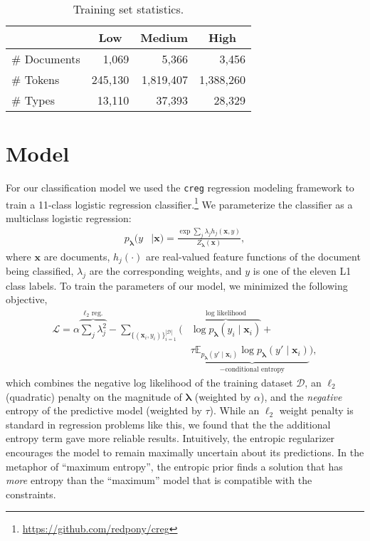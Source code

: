\documentclass[11pt,letterpaper]{article}
\begin{document}
\begin{table}[hbt]
\small\centering
\begin{tabular}{lrrr}
  & \multicolumn{1}{c}{\textbf{Low}} & \multicolumn{1}{c}{\textbf{Medium}} & \multicolumn{1}{c}{\textbf{High}} \\
\hline
\# Documents & 1,069 & 5,366 & 3,456 \\
\# Tokens & 245,130 & 1,819,407 & 1,388,260 \\ 
\# Types & 13,110 & 37,393 & 28,329 \\ 
\end{tabular}
\caption{Training set statistics.}
\label{tbl:stats:level}
\end{table} 

\section{Model}
\label{sec:model}
For our classification model we used the \texttt{creg} regression modeling framework to train a 11-class logistic regression classifier.\footnote{\url{https://github.com/redpony/creg}}  We parameterize the classifier as a multiclass logistic regression:
\begin{align*}
p_{\boldsymbol{\lambda}}(y& \mid \textbf{x})= \frac{\exp \sum_j \lambda_j h_j(\textbf{x},y)}{Z_{\boldsymbol{\lambda}}(\textbf{x})} ,
\end{align*}
where $\textbf{x}$ are documents, $h_j(\cdot)$ are real-valued feature functions of the document being classified, $\lambda_j$ are the corresponding weights, and $y$ is one of the eleven L1 class labels. To train the parameters of our model, we minimized the following objective,
\begin{align*}
\mathcal{L} = \alpha \overbrace{\sum_j \lambda_j^2}^{\textrm{$\ell_2$ reg.}} - \sum_{\{(\textbf{x}_i,y_i )\}_{i=1}^{|\mathcal{D}|}} \Big(& \overbrace{\log p_{\boldsymbol{\lambda}}(y_i \mid \textbf{x}_i)}^{\textrm{log likelihood}}  + \\
& \tau \underbrace{\mathbb{E}_{p_{\boldsymbol{\lambda}}(y' \mid \textbf{x}_i)} \log p_{\boldsymbol{\lambda}}(y' \mid \textbf{x}_i)}_{-\textrm{conditional entropy}}\Big) ,
\end{align*}
which combines the negative log likelihood of the training dataset $\mathcal{D}$, an $\ell_2$ (quadratic) penalty on the magnitude of $\boldsymbol{\lambda}$ (weighted by $\alpha$), and the \emph{negative} entropy of the predictive model (weighted by $\tau$). While an $\ell_2$ weight penalty is standard in regression problems like this, we found that the the additional entropy term gave more reliable results. Intuitively, the entropic regularizer encourages the model to remain maximally uncertain about its predictions. In the metaphor of ``maximum entropy'', the entropic prior finds a solution that has \emph{more} entropy than the ``maximum'' model that is compatible with the constraints.
\end{document}
